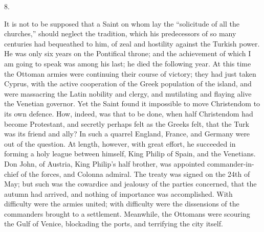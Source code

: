 8.

It is not to be supposed that
a Saint on whom lay the ``solicitude of all the churches,'' should
neglect the tradition, which his predecessors of so many centuries had
bequeathed to him, of zeal and hostility against the Turkish power. He
was only six years on the Pontifical throne; and the achievement of
which I am going to speak was among his last; he died the following
year. At this time the Ottoman armies were continuing their course of
victory; they had just taken Cyprus, with the active cooperation of
the Greek population of the island, and were massacring the Latin
nobility and clergy, and mutilating and flaying alive the Venetian
governor. Yet the Saint found it impossible to move Christendom to its
own defence. How, indeed, was that to be done, when half Christendom
had become Protestant, and secretly perhaps felt as the Greeks felt,
that the Turk was its friend and ally? In such a quarrel England,
France, and Germany were out of the question. At length, however, with
great effort, he succeeded in forming a holy league between himself,
King Philip of Spain, and the Venetians. Don John, of Austria, King
Philip's half brother, was appointed commander-in-chief of the forces,
and Colonna admiral. The treaty was signed on the 24th of May; but
such was the cowardice and jealousy of the parties concerned, that the
autumn had arrived, and nothing of importance was accomplished. With
difficulty were the armies united; with difficulty were the
dissensions of the commanders brought to a settlement. Meanwhile, the
Ottomans were scouring the Gulf of Venice, blockading the ports, and
terrifying the city itself.

